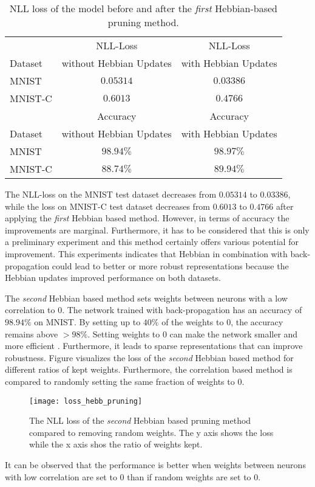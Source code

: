 \begin{table}[h] 
    \centering
	 \begin{tabular}{|l c c|} 
    	\hline
    	 & NLL-Loss & NLL-Loss \\
        Dataset & without Hebbian Updates & with Hebbian Updates\\
        \hline
        MNIST & \(0.05314\) & \(0.03386\) \\
        MNIST-C & \(0.6013\) & \(0.4766\) \\
        \hline
    	 &Accuracy & Accuracy \\
        Dataset & without Hebbian Updates & with Hebbian Updates\\
        \hline
        MNIST & \(98.94\%\) & \(98.97\%\) \\
        MNIST-C & \(88.74\%\) & \(89.94\%\) \\
        \hline
    \end{tabular}
    \caption[NLL Loss of Hebbian Pruning Network]{NLL loss of the model before and after the \emph{first} Hebbian-based pruning method.}
\end{table}

The NLL-loss on the MNIST test dataset decreases from \(0.05314\) to \(0.03386\), while the loss on MNIST-C test dataset decreases from \(0.6013\) to \(0.4766\) after applying the \emph{first} Hebbian based method.
However, in terms of accuracy the improvements are marginal.
Furthermore, it has to be considered that this is only a preliminary experiment and this method certainly offers various potential for improvement.
This experiments indicates that Hebbian in combination with back-propagation could lead to better or more robust representations because the Hebbian updates improved performance on both datasets.

The \emph{second} Hebbian based method sets weights between neurons with a low correlation to \(0\).
The network trained with back-propagation has an accuracy of \(98.94\%\) on MNIST.
By setting up to \(40\%\) of the weights to \(0\), the accuracy remains above \(>98\%\).
Setting weights to \(0\) can make the network smaller and more efficient .
Furthermore, it leads to sparse representations that can improve robustness.
Figure  visualizes the loss of the \emph{second} Hebbian based method for different ratios of kept weights.
Furthermore, the correlation based method is compared to randomly setting the same fraction of weights to \(0\).

\begin{figure}[h]
    \centering
    \texttt{[image: loss\_hebb\_pruning]}
    \caption[NLL Loss of Hebbian Pruning]{The NLL loss of the \emph{second} Hebbian based pruning method compared to removing random weights. The y axis shows the loss while the x axis shos the ratio of weights kept. }
\end{figure}

It can be observed that the performance is better when weights between neurons with low correlation are set to \(0\) than if random weights are set to \(0\).


